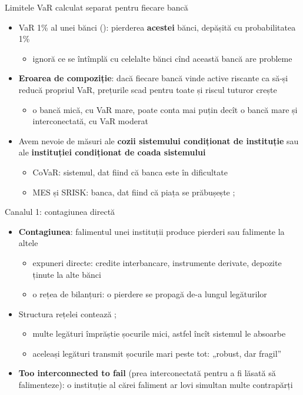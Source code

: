 \begin{frame}{Limitele VaR calculat separat pentru fiecare bancă}
\itemsize{\small}
\begin{itemize}
    \item VaR 1\% al unei bănci (): pierderea \textbf{acestei} bănci, depășită cu probabilitatea 1\%
    \begin{itemize}
        \item ignoră ce se întîmplă cu celelalte bănci cînd această bancă are probleme
    \end{itemize}
    \item \textbf{Eroarea de compoziție}: dacă fiecare bancă vinde active riscante ca să-și reducă propriul VaR, prețurile scad pentru toate și riscul tuturor crește
    \begin{itemize}
        \item o bancă mică, cu VaR mare, poate conta mai puțin decît o bancă mare și interconectată, cu VaR moderat
    \end{itemize}
    \item Avem nevoie de măsuri ale \textbf{cozii sistemului condiționat de instituție} sau ale \textbf{instituției condiționat de coada sistemului}
    \begin{itemize}
        \item CoVaR: sistemul, dat fiind că banca este în dificultate 
        \item MES și SRISK: banca, dat fiind că piața se prăbușește ; 
    \end{itemize}
\end{itemize}
\end{frame}

\begin{frame}{Canalul 1: contagiunea directă}
\itemsize{\small}
\begin{itemize}
    \item \textbf{Contagiunea}: falimentul unei instituții produce pierderi sau falimente la altele
    \begin{itemize}
        \item expuneri directe: credite interbancare, instrumente derivate, depozite ținute la alte bănci
        \item o rețea de bilanțuri: o pierdere se propagă de-a lungul legăturilor 
    \end{itemize}
    \item Structura rețelei contează ; 
    \begin{itemize}
        \item multe legături împrăștie șocurile mici, astfel încît sistemul le absoarbe
        \item aceleași legături transmit șocurile mari peste tot: „robust, dar fragil”
    \end{itemize}
    \item \textbf{Too interconnected to fail} (prea interconectată pentru a fi lăsată să falimenteze): o instituție al cărei faliment ar lovi simultan multe contrapărți
\end{itemize}
\end{frame}

